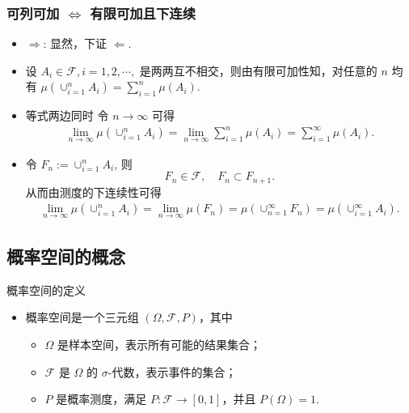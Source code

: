 \documentclass[Prob-All.tex]{subfiles}
\begin{document}
\begin{frame}
	\frametitle{可列可加 $\Leftrightarrow$ 有限可加且下连续}
	\begin{itemize}[<+-|alert@+>]
	\item $\Rightarrow$: 显然，下证 $\Leftarrow$.
	\item 设 $A_i\in\mathcal{F},i=1,2,\cdots,$ 是两两互不相交，则由有限可加性知，对任意的 $n$ 均有
	$\mu(\cup_{i=1}^nA_i)=\sum_{i=1}^n\mu(A_i)$.
	\item 等式两边同时
	令 $n\rightarrow\infty$ 可得
	\begin{eqnarray*}
		\lim_{n\rightarrow\infty} \mu(\cup_{i=1}^nA_i)=\lim_{n\rightarrow\infty}\sum_{i=1}^n\mu(A_i)=\sum_{i=1}^\infty \mu(A_i).
	\end{eqnarray*}
	\item 令 $F_n:=\cup_{i=1}^nA_i$, 则
	 $$F_n\in \mathcal{F},\quad  F_n\subset F_{n+1}.$$
	 从而由测度的下连续性可得
	\begin{eqnarray*}
		\lim_{n\rightarrow\infty} \mu(\cup_{i=1}^nA_i)= \lim_{n\rightarrow\infty} \mu(F_n)=\mu(\cup_{n=1}^\infty F_n)=\mu(\cup_{i=1}^\infty A_i).
	\end{eqnarray*}
	\end{itemize}




\end{frame}


\subsection{概率空间的概念}
\begin{frame}{概率空间的定义}
	\begin{itemize}[<+-|alert@+>]
		\item 概率空间是一个三元组 $(\Omega, \mathcal{F}, P)$，其中
		\begin{itemize}
			\item $\Omega$ 是样本空间，表示所有可能的结果集合；
			\item $\mathcal{F}$ 是 $\Omega$ 的 $\sigma$-代数，表示事件的集合；
			\item $P$ 是概率测度，满足 $P: \mathcal{F} \rightarrow [0,1]$，并且 $P(\Omega)=1$.
		\end{itemize}
	\end{itemize}
\end{frame}
\end{document}
